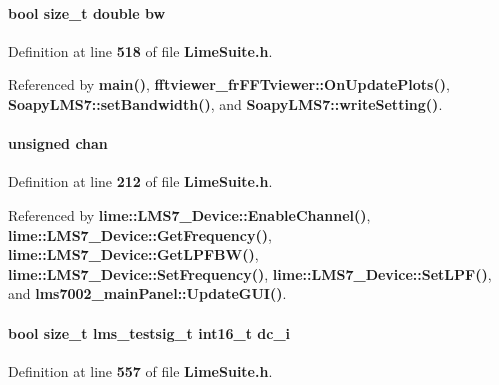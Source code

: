 \paragraph[{bw}]{\setlength{\rightskip}{0pt plus 5cm}bool size\+\_\+t double bw}\label{group__FN__HIGH__LVL_ga72fb354f0be1ddb0d4833e33819f9a00}


Definition at line {\bf 518} of file {\bf Lime\+Suite.\+h}.



Referenced by {\bf main()}, {\bf fftviewer\+\_\+fr\+F\+F\+Tviewer\+::\+On\+Update\+Plots()}, {\bf Soapy\+L\+M\+S7\+::set\+Bandwidth()}, and {\bf Soapy\+L\+M\+S7\+::write\+Setting()}.

\paragraph[{chan}]{\setlength{\rightskip}{0pt plus 5cm}unsigned chan}\label{group__FN__HIGH__LVL_gafeb55c5de97f9ab2ccf6de9b3144ccfc}


Definition at line {\bf 212} of file {\bf Lime\+Suite.\+h}.



Referenced by {\bf lime\+::\+L\+M\+S7\+\_\+\+Device\+::\+Enable\+Channel()}, {\bf lime\+::\+L\+M\+S7\+\_\+\+Device\+::\+Get\+Frequency()}, {\bf lime\+::\+L\+M\+S7\+\_\+\+Device\+::\+Get\+L\+P\+F\+B\+W()}, {\bf lime\+::\+L\+M\+S7\+\_\+\+Device\+::\+Set\+Frequency()}, {\bf lime\+::\+L\+M\+S7\+\_\+\+Device\+::\+Set\+L\+P\+F()}, and {\bf lms7002\+\_\+main\+Panel\+::\+Update\+G\+U\+I()}.

\paragraph[{dc\+\_\+i}]{\setlength{\rightskip}{0pt plus 5cm}bool size\+\_\+t {\bf lms\+\_\+testsig\+\_\+t} int16\+\_\+t dc\+\_\+i}\label{group__FN__HIGH__LVL_gadb235d08b497acd79d23d37db020fbb3}


Definition at line {\bf 557} of file {\bf Lime\+Suite.\+h}.

